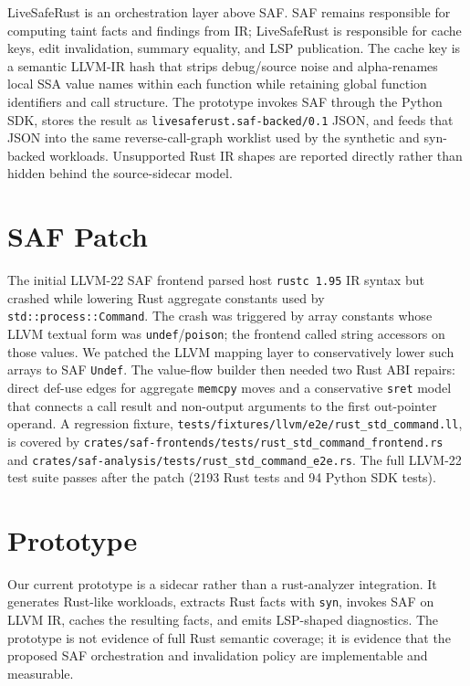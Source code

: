 \documentclass[sigconf,nonacm]{acmart}
\begin{document}
LiveSafeRust is an orchestration layer above SAF. SAF remains responsible for
computing taint facts and findings from IR; LiveSafeRust is responsible for
cache keys, edit invalidation, summary equality, and LSP publication. The
cache key is a semantic LLVM-IR hash that strips debug/source noise and
alpha-renames local SSA value names within each function while retaining global
function identifiers and call structure. The prototype invokes SAF through the Python SDK, stores the result as
\texttt{livesaferust.saf-backed/0.1} JSON, and feeds that JSON into the same
reverse-call-graph worklist used by the synthetic and syn-backed workloads.
Unsupported Rust IR shapes are reported directly rather than hidden behind the
source-sidecar model.

\section{SAF Patch}

The initial LLVM-22 SAF frontend parsed host \texttt{rustc 1.95} IR syntax but
crashed while lowering Rust aggregate constants used by
\texttt{std::process::Command}. The crash was triggered by array constants whose
LLVM textual form was \texttt{undef}/\texttt{poison}; the frontend called string
accessors on those values. We patched the LLVM mapping layer to conservatively
lower such arrays to SAF \texttt{Undef}. The value-flow builder then needed two
Rust ABI repairs: direct def-use edges for aggregate \texttt{memcpy} moves and a
conservative \texttt{sret} model that connects a call result and non-output
arguments to the first out-pointer operand. A regression fixture,
\texttt{tests/fixtures/llvm/e2e/rust\_std\_command.ll}, is covered by
\texttt{crates/saf-frontends/tests/rust\_std\_command\_frontend.rs} and
\texttt{crates/saf-analysis/tests/rust\_std\_command\_e2e.rs}. The full
LLVM-22 test suite passes after the patch (2193 Rust tests and 94 Python SDK
tests).

\section{Prototype}

Our current prototype is a sidecar rather than a rust-analyzer integration. It
generates Rust-like workloads, extracts Rust facts with \texttt{syn}, invokes
SAF on LLVM IR, caches the resulting facts, and emits LSP-shaped diagnostics.
The prototype is not evidence of full Rust semantic coverage; it is evidence
that the proposed SAF orchestration and invalidation policy are implementable
and measurable.
\end{document}
